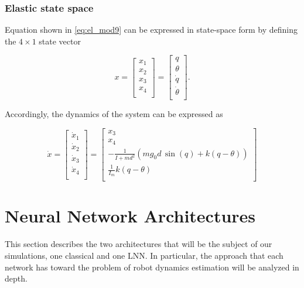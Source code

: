 \documentclass[a4paper]{article}
\begin{document}
\subsubsection{Elastic state space}
Equation shown in \ref{eq:el_mod9} can be expressed in state-space form by defining the $4\times1$ state vector

\begin{equation}
    \nonumber
    x = 
    \begin{bmatrix}    
        x_1 \\
        x_2 \\
        x_3 \\
        x_4 \\
    \end{bmatrix} = \begin{bmatrix}    
        q\\
        \theta\\
        \dot{q}\\
        \dot{\theta}\\
    \end{bmatrix}.
\end{equation}

Accordingly, the dynamics of the system can be expressed as

\begin{equation}
    \nonumber
    \dot{x} = 
    \begin{bmatrix}    
        \dot{x}_1 \\
        \dot{x}_2 \\
        \dot{x}_3 \\
        \dot{x}_4 \\
    \end{bmatrix} = \begin{bmatrix}    
        x_3\\
        x_4\\
        -\frac{1}{I+md^2} (mg_0d\, \sin(q) + k(q-\theta))\\
        \frac{1}{I_m} k(q-\theta)\\
    \end{bmatrix}
\end{equation}


\section{Neural Network Architectures}
\label{sec:nn_arch}
This section describes the two architectures that will be the subject of our simulations, one classical and one LNN. In particular, the approach that each network has toward the problem of robot dynamics estimation will be analyzed in depth.
\end{document}
